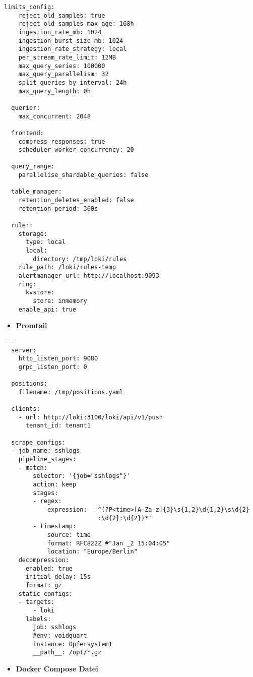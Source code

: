 {\begin{Verbatim}[frame=single]
  limits_config:
    reject_old_samples: true
    reject_old_samples_max_age: 168h
    ingestion_rate_mb: 1024
    ingestion_burst_size_mb: 1024
    ingestion_rate_strategy: local
    per_stream_rate_limit: 12MB
    max_query_series: 100000
    max_query_parallelism: 32
    split_queries_by_interval: 24h
    max_query_length: 0h
  
  querier:
    max_concurrent: 2048
  
  frontend:
    compress_responses: true
    scheduler_worker_concurrency: 20
  
  query_range:
    parallelise_shardable_queries: false
  
  table_manager:
    retention_deletes_enabled: false
    retention_period: 360s
  
  ruler:
    storage:
      type: local
      local:
        directory: /tmp/loki/rules
    rule_path: /loki/rules-temp
    alertmanager_url: http://localhost:9093
    ring:
      kvstore:
        store: inmemory
    enable_api: true
\end{Verbatim}
}

\begin{itemize}[noitemsep]
    \item \textbf{Promtail} 
\end{itemize}

{
\begin{Verbatim}[frame=single]
  ---
  server:
    http_listen_port: 9080
    grpc_listen_port: 0
  
  positions:
    filename: /tmp/positions.yaml
  
  clients:
    - url: http://loki:3100/loki/api/v1/push
      tenant_id: tenant1
  
  scrape_configs:
  - job_name: sshlogs
    pipeline_stages:
    - match:
        selector: '{job="sshlogs"}'
        action: keep
        stages:
        - regex:
            expression:  '^(?P<time>[A-Za-z]{3}\s{1,2}\d{1,2}\s\d{2}
                          :\d{2}:\d{2})*'
        - timestamp:
            source: time
            format: RFC822Z #"Jan _2 15:04:05"
            location: "Europe/Berlin"
    decompression:
      enabled: true
      initial_delay: 15s
      format: gz
    static_configs:
    - targets:
        - loki
      labels:
        job: sshlogs
        #env: voidquart
        instance: Opfersystem1
        __path__: /opt/*.gz
\end{Verbatim}
}

\newpage
\begin{itemize}[noitemsep]
    \item \textbf{Docker Compose Datei} 
\end{itemize}

